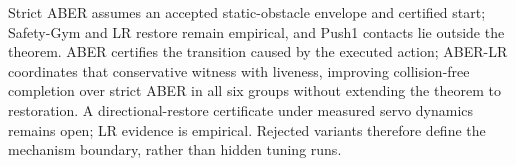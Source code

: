 \documentclass[letterpaper]{article}
\begin{document}
Strict ABER assumes an accepted static-obstacle envelope and certified start;
Safety-Gym and LR restore remain empirical, and Push1 contacts lie outside the
theorem.  ABER certifies the transition caused by the executed action;
ABER-LR coordinates that conservative witness with liveness, improving
collision-free completion over strict ABER in all six groups without extending
the theorem to restoration.  A directional-restore certificate under measured
servo dynamics remains open; LR evidence is empirical.  Rejected variants
therefore define the mechanism boundary, rather than hidden tuning runs.


\end{document}
